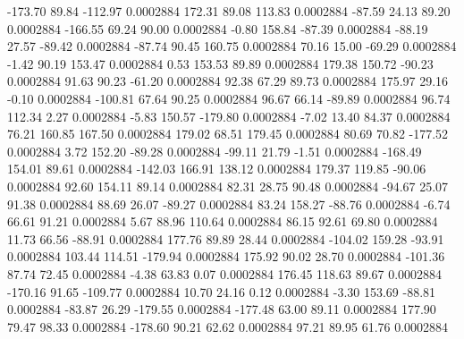      -173.70       89.84     -112.97     0.0002884
      172.31       89.08      113.83     0.0002884
      -87.59       24.13       89.20     0.0002884
     -166.55       69.24       90.00     0.0002884
       -0.80      158.84      -87.39     0.0002884
      -88.19       27.57      -89.42     0.0002884
      -87.74       90.45      160.75     0.0002884
       70.16       15.00      -69.29     0.0002884
       -1.42       90.19      153.47     0.0002884
        0.53      153.53       89.89     0.0002884
      179.38      150.72      -90.23     0.0002884
       91.63       90.23      -61.20     0.0002884
       92.38       67.29       89.73     0.0002884
      175.97       29.16       -0.10     0.0002884
     -100.81       67.64       90.25     0.0002884
       96.67       66.14      -89.89     0.0002884
       96.74      112.34        2.27     0.0002884
       -5.83      150.57     -179.80     0.0002884
       -7.02       13.40       84.37     0.0002884
       76.21      160.85      167.50     0.0002884
      179.02       68.51      179.45     0.0002884
       80.69       70.82     -177.52     0.0002884
        3.72      152.20      -89.28     0.0002884
      -99.11       21.79       -1.51     0.0002884
     -168.49      154.01       89.61     0.0002884
     -142.03      166.91      138.12     0.0002884
      179.37      119.85      -90.06     0.0002884
       92.60      154.11       89.14     0.0002884
       82.31       28.75       90.48     0.0002884
      -94.67       25.07       91.38     0.0002884
       88.69       26.07      -89.27     0.0002884
       83.24      158.27      -88.76     0.0002884
       -6.74       66.61       91.21     0.0002884
        5.67       88.96      110.64     0.0002884
       86.15       92.61       69.80     0.0002884
       11.73       66.56      -88.91     0.0002884
      177.76       89.89       28.44     0.0002884
     -104.02      159.28      -93.91     0.0002884
      103.44      114.51     -179.94     0.0002884
      175.92       90.02       28.70     0.0002884
     -101.36       87.74       72.45     0.0002884
       -4.38       63.83        0.07     0.0002884
      176.45      118.63       89.67     0.0002884
     -170.16       91.65     -109.77     0.0002884
       10.70       24.16        0.12     0.0002884
       -3.30      153.69      -88.81     0.0002884
      -83.87       26.29     -179.55     0.0002884
     -177.48       63.00       89.11     0.0002884
      177.90       79.47       98.33     0.0002884
     -178.60       90.21       62.62     0.0002884
       97.21       89.95       61.76     0.0002884
